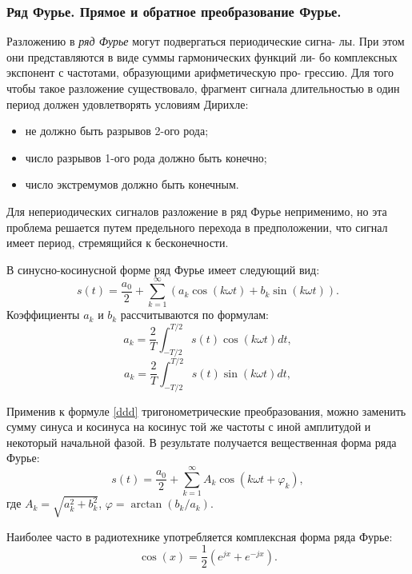 \documentclass[a4paper,14pt]{extarticle}
\begin{document}
\subsubsection{Ряд Фурье. Прямое и обратное преобразование Фурье.}
Разложению в \textit{ряд Фурье} могут подвергаться периодические сигна-
лы. При этом они представляются в виде суммы гармонических функций ли-
бо комплексных экспонент с частотами, образующими арифметическую про-
грессию. Для того чтобы такое разложение существовало, фрагмент сигнала
длительностью в один период должен удовлетворять условиям Дирихле:
\begin{itemize}
\item не должно быть разрывов 2-ого рода;
\item число разрывов 1-ого рода должно быть конечно;
\item число экстремумов должно быть конечным.
\end{itemize}
Для непериодических сигналов разложение в ряд Фурье неприменимо,
но эта проблема решается путем предельного перехода в предположении, что
сигнал имеет период, стремящийся к бесконечности.

В синусно-косинусной форме ряд Фурье имеет следующий вид:
\begin{equation}
s(t) = \frac{a_0}{2} + \sum_{k=1}^\infty (a_k \cos(k\omega t) + b_k \sin(k\omega t)).
\label{ddd}
\end{equation}
Коэффициенты $a_k$ и $b_k$ рассчитываются по формулам:
\begin{equation*}
a_k = \frac{2}{T} \int_{-T/2}^{T/2} s(t) \cos (k\omega t) dt,
\end{equation*}
\begin{equation*}
a_k = \frac{2}{T} \int_{-T/2}^{T/2} s(t) \sin (k\omega t) dt,
\end{equation*}

Применив к формуле \ref{ddd} тригонометрические преобразования, можно
заменить сумму синуса и косинуса на косинус той же частоты с иной амплитудой и некоторый начальной фазой. В результате получается вещественная форма ряда Фурье:
\begin{equation*}
s(t) = \frac{a_0}{2} + \sum_{k=1}^\infty A_k \cos(k\omega t + \varphi_k),
\end{equation*}
где $A_k = \sqrt{a_k^2 + b_k^2}$, $\varphi = \arctan(b_k/a_k)$.

Наиболее часто в радиотехнике употребляется комплексная форма ряда Фурье:
\begin{equation*}
\cos (x) = \frac{1}{2} (e^{jx} + e^{-jx}).
\end{equation*}
\end{document}
